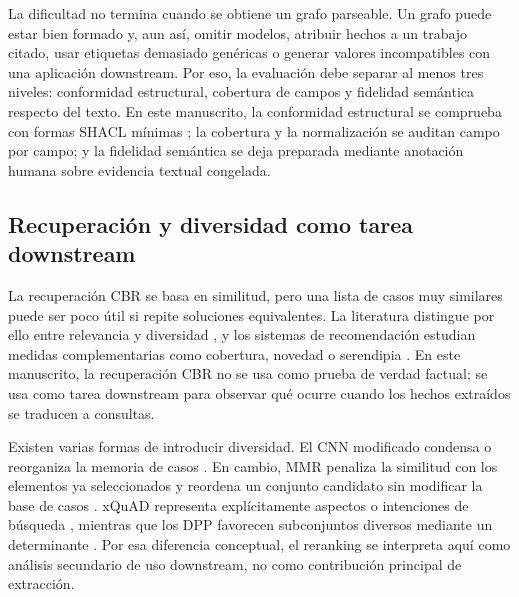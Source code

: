 \documentclass[11pt,a4paper]{article}
\begin{document}
La dificultad no termina cuando se obtiene un grafo parseable. Un grafo puede estar bien formado y, aun así, omitir modelos, atribuir hechos a un trabajo citado, usar etiquetas demasiado genéricas o generar valores incompatibles con una aplicación downstream. Por eso, la evaluación debe separar al menos tres niveles: conformidad estructural, cobertura de campos y fidelidad semántica respecto del texto. En este manuscrito, la conformidad estructural se comprueba con formas SHACL mínimas \citep{SHACL2017}; la cobertura y la normalización se auditan campo por campo; y la fidelidad semántica se deja preparada mediante anotación humana sobre evidencia textual congelada.

\subsection{Recuperación y diversidad como tarea downstream}

La recuperación CBR se basa en similitud, pero una lista de casos muy similares puede ser poco útil si repite soluciones equivalentes. La literatura distingue por ello entre relevancia y diversidad \citep{SmythMcClave2001Diversity,McSherry2002Diversity}, y los sistemas de recomendación estudian medidas complementarias como cobertura, novedad o serendipia \citep{KaminskasBridge2016BeyondAccuracy}. En este manuscrito, la recuperación CBR no se usa como prueba de verdad factual; se usa como tarea downstream para observar qué ocurre cuando los hechos extraídos se traducen a consultas.

Existen varias formas de introducir diversidad. El CNN modificado condensa o reorganiza la memoria de casos \citep{MunozPena2025Diversity}. En cambio, MMR penaliza la similitud con los elementos ya seleccionados y reordena un conjunto candidato sin modificar la base de casos \citep{CarbonellGoldstein1998MMR}. xQuAD representa explícitamente aspectos o intenciones de búsqueda \citep{Santos2010xQuAD}, mientras que los DPP favorecen subconjuntos diversos mediante un determinante \citep{Gan2020DPP}. Por esa diferencia conceptual, el reranking se interpreta aquí como análisis secundario de uso downstream, no como contribución principal de extracción.
\end{document}
